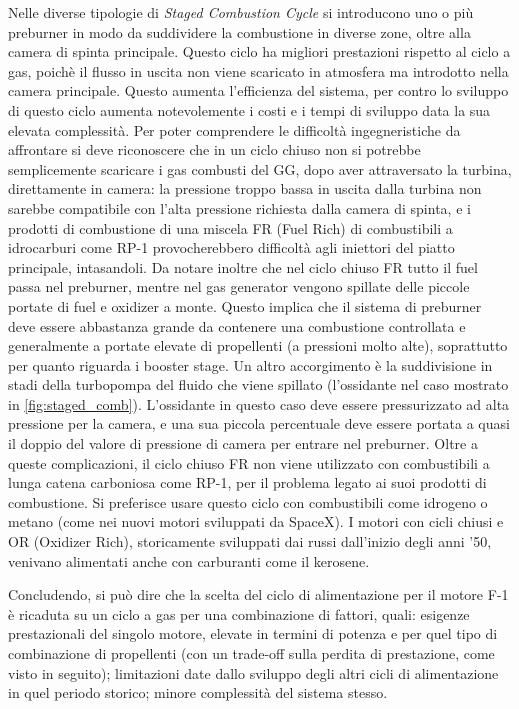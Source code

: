 Nelle diverse tipologie di \textit{Staged Combustion Cycle} si introducono uno o più preburner in modo da suddividere la combustione in diverse zone, oltre alla camera di spinta principale.
Questo ciclo ha migliori prestazioni rispetto al ciclo a gas, poichè il flusso in uscita non viene scaricato in atmosfera ma introdotto nella camera principale. Questo aumenta l'efficienza del sistema, per contro lo sviluppo di questo ciclo aumenta notevolemente i costi e i tempi di sviluppo data la sua elevata complessità.
Per poter comprendere le difficoltà ingegneristiche da affrontare si deve riconoscere che in un ciclo chiuso non si potrebbe semplicemente scaricare i gas combusti del GG, dopo aver attraversato la turbina, direttamente in camera: la pressione troppo bassa in uscita dalla turbina non sarebbe compatibile con l'alta pressione richiesta dalla camera di spinta, e i prodotti di combustione di una miscela FR (Fuel Rich) di combustibili a idrocarburi come RP-1 provocherebbero difficoltà agli iniettori del piatto principale, intasandoli.
Da notare inoltre che nel ciclo chiuso FR tutto il fuel passa nel preburner, mentre nel gas generator vengono spillate delle piccole portate di fuel e oxidizer a monte. Questo implica che il sistema di preburner deve essere abbastanza grande da contenere una combustione controllata e generalmente a portate elevate di propellenti (a pressioni molto alte), soprattutto per quanto riguarda i booster stage.
Un altro accorgimento è la suddivisione in stadi della turbopompa del fluido che viene spillato (l'ossidante nel caso mostrato in \autoref{fig:staged_comb}). L'ossidante in questo caso deve essere pressurizzato ad alta pressione per la camera, e una sua piccola percentuale deve essere portata a quasi il doppio del valore di pressione di camera per entrare nel preburner.
Oltre a queste complicazioni, il ciclo chiuso FR non viene utilizzato con combustibili a lunga catena carboniosa come RP-1, per il problema legato ai suoi prodotti di combustione. Si preferisce usare questo ciclo con combustibili come idrogeno o metano (come nei nuovi motori sviluppati da SpaceX). I motori con cicli chiusi e OR (Oxidizer Rich), storicamente sviluppati dai russi dall'inizio degli anni '50, venivano alimentati anche con carburanti come il kerosene.

Concludendo, si può dire che la scelta del ciclo di alimentazione per il motore F-1 è ricaduta su un ciclo a gas per una combinazione di fattori, quali: esigenze prestazionali del singolo motore, elevate in termini di potenza e per quel tipo di combinazione di propellenti (con un trade-off sulla perdita di prestazione, come visto in seguito); limitazioni date dallo sviluppo degli altri cicli di alimentazione in quel periodo storico; minore complessità del sistema stesso.

